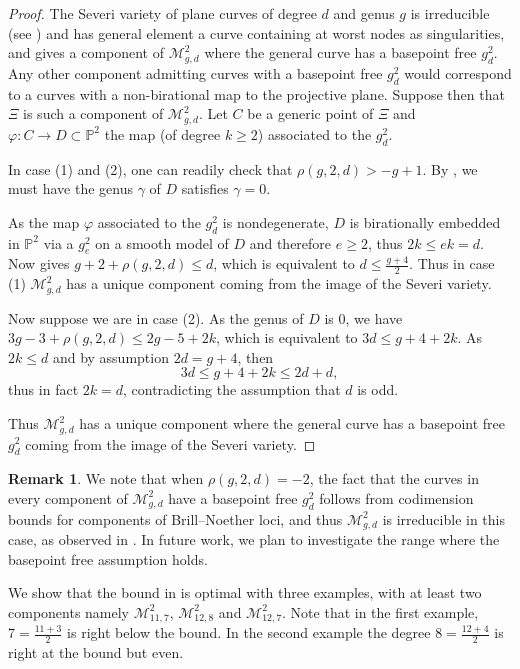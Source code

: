 \documentclass[11pt]{amsart}
\newcommand{\PP}{\mathbb{P}}
\newcommand{\g}[2]{g^{#1}_{#2}}
\newcommand{\BN}[3]{\mathcal{M}^{#2}_{#1,#3}}
\theoremstyle{definition}
\theoremstyle{definition}
\newtheorem{remark}[theorem]{Remark}
\begin{document}
\begin{proof}
	The Severi variety of plane curves of degree $d$ and genus $g$ is irreducible (see \cite{Harris_Severi_86}) and has general element a curve containing at worst nodes as singularities, and gives a component of $\BN{g}{2}{d}$ where the general curve has a basepoint free $\g{2}{d}$. Any other component admitting curves with a basepoint free $\g{2}{d}$ would correspond to a curves with a non-birational map to the projective plane.
	Suppose then that $\Xi$ is such a component of $\BN{g}{2}{d}$.
	Let $C$ be a generic point of $\Xi$  and  $\varphi:C\to D\subset \PP^2$ the map (of degree $k\ge 2$) associated to the $\g{2}{d}$. 
	
	In case (1) and (2), one can readily check that $\rho(g,2,d)>-g+1$.
	By , we must have the genus $\gamma $ of $D$ satisfies $\gamma=0$.
	
	As the map $\varphi$ associated to the $\g{2}{d}$ is nondegenerate, $D$ is birationally embedded in $\PP^2$ via a $\g{2}{e}$ on a smooth model of $D$
	and therefore	 $e\geq 2$, thus $2k\leq ek=d$. Now  gives 
	$g+2+\rho(g,2,d)\leq d$, which is equivalent to $d\leq \frac{g+4}{2}$. Thus in case (1) $\BN{g}{2}{d}$ has a unique component coming from the image of the Severi variety.
	
	Now suppose we are in case (2). 
	As the genus of $D$ is $0$, we have $3g-3+\rho(g,2,d)\leq 2g-5+2k$, which is equivalent to $3d\leq g+4+2k$. As $2k\leq d$ and by assumption $2d= g+4$, then \[3d\leq g+4+2k\leq 2d+d,\] 
	thus in fact $2k=d$, contradicting the  assumption that $d$ is odd. 
	
	Thus $\BN{g}{2}{d}$ has a unique component where the general curve has a basepoint free $\g{2}{d}$ coming from the image of the Severi variety.
\end{proof}

\begin{remark}
	We note that when $\rho(g,2,d)=-2$, the fact that the curves in every component of $\BN{g}{2}{d}$ have a basepoint free $\g{2}{d}$ follows from codimension bounds for components of Brill--Noether loci, and thus $\BN{g}{2}{d}$ is irreducible in this case, as observed in \cite{CHOI2022}. In future work, we plan to investigate the range where the basepoint free assumption holds.
\end{remark}

We show that the bound in  is optimal with three examples, with at least two components namely  $\BN{11}{2}{7}$,  $\BN{12}{2}{8}$ and $\BN{12}{2}{7}$.
Note that in the first example, $7=\frac {11+3}2$ is right below the bound. 
In the second example  the degree $8=\frac{12+4}2$ is  right at the bound but even.%
\end{document}
